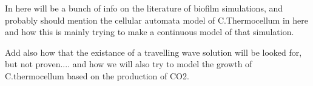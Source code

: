 In here will be a bunch of info on the literature of biofilm simulations, and probably should mention the cellular automata model of C.Thermocellum in here and how this is mainly trying to make a continuous model of that simulation. 

Add also how that the existance of a travelling wave solution will be looked for, but not proven.... and how we will also try to model the growth of C.thermocellum based on the production of CO2. 
